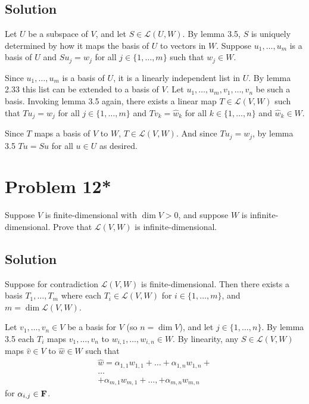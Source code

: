 \documentclass{article}
\begin{document}
\subsection*{Solution}
Let $U$ be a subspace of $V$, and let $S\in\mathcal{L}(U, W)$. By lemma 3.5, $S$ is uniquely determined by how it maps the basis of $U$ to vectors in $W$. Suppose $u_1,\ldots,u_m$ is a basis of $U$ and $Su_j=w_j$ for all $j\in\{1,\ldots,m\}$ such that $w_j\in W$.

\vs

Since $u_1,\ldots,u_m$ is a basis of $U$, it is a linearly independent list in $U$. By lemma 2.33 this list can be extended to a basis of $V$. Let $u_1,\ldots,u_m, v_1,\ldots,v_n$ be such a basis. Invoking lemma 3.5 again, there exists a linear map $T\in\mathcal{L}(V, W)$ such that $Tu_j=w_j$ for all $j\in\{1,\ldots,m\}$ and $Tv_k=\hat{w}_k$ for all $k\in\{1,\ldots, n\}$ and $\hat{w}_k\in W$.

\vs

Since $T$ maps a basis of $V$ to $W$, $T\in\mathcal{L}(V, W)$. And since $Tu_j=w_j$, by lemma 3.5 $Tu=Su$ for all $u\in U$ as desired.

\section*{Problem 12*}
Suppose $V$ is finite-dimensional with $\dim V>0$, and suppose $W$ is infinite-dimensional. Prove that $\mathcal{L}(V, W)$ is infinite-dimensional.

\subsection*{Solution}
Suppose for contradiction $\mathcal{L}(V, W)$ is finite-dimensional. Then there exists a basis $T_1,\ldots,T_m$ where each $T_i\in\mathcal{L}(V, W)$ for $i\in\{1,\ldots,m\}$, and $m=\dim\mathcal{L}(V, W)$.

\vs

Let $v_1,\ldots,v_n\in V$ be a basis for $V$ (so $n=\dim V$), and let $j\in\{1,\ldots,n\}$. By lemma 3.5 each $T_i$ maps $v_1,\ldots,v_n$ to $w_{i,1},\ldots,w_{i,n}\in W$. By linearity, any $S\in\mathcal{L}(V, W)$ maps $\hat{v}\in V$ to $\hat{w}\in W$ such that
\begin{align*}
\hat{w}=\alpha_{1,1}w_{1, 1}+\ldots+\alpha_{1,n}w_{1, n}+\\
\ldots\\
+\alpha_{m,1}w_{m,1}+\ldots,+\alpha_{m,n}w_{m, n}    
\end{align*}
for $\alpha_{i,j}\in\mathbf{F}$.
\end{document}
